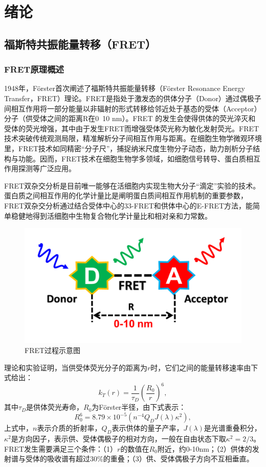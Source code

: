 \chapter{绪论}

\section{福斯特共振能量转移（FRET）}

\subsection{FRET原理概述}

\ifshowtext
1948年，Förster首次阐述了福斯特共振能量转移（Förster Resonance Energy Transfer，FRET）理论。FRET是指处于激发态的供体分子（Donor）通过偶极子间相互作用将一部分能量以非辐射的形式转移给邻近处于基态的受体（Acceptor）分子（供受体之间的距离R在0~10 nm）。FRET 的发生会使得供体的荧光淬灭和受体的荧光增强，其中由于发生FRET而增强受体荧光称为敏化发射荧光。FRET技术突破传统观测局限，精准解析分子间相互作用与距离。在细胞生物学微观环境里，FRET技术如同精密“分子尺”，捕捉纳米尺度生物分子动态，助力剖析分子结构与功能。因而，FRET技术在细胞生物学多领域，如细胞信号转导、蛋白质相互作用探测等广泛应用。

FRET双杂交分析是目前唯一能够在活细胞内实现生物大分子“滴定”实验的技术。蛋白质之间相互作用的化学计量比是阐明蛋白质间相互作用机制的重要参数，FRET双杂交分析通过结合受体中心的33-FRET和供体中心的E-FRET方法，能简单稳健地得到活细胞中生物复合物化学计量比和相对亲和力常数。
\begin{figure}[htbp]
    \centering
    \includegraphics[width=0.5\linewidth]{../figures/1/1_FRET过程示意图.png}
    \caption{FRET过程示意图}
    \label{fig:fret}
\end{figure}

理论和实验证明，当供受体荧光分子的距离为$r$时，它们之间的能量转移速率由下式给出：
\begin{equation}
    k_T(r)=\frac{1}{\tau_D}(\frac{R_0}{r})^6, \label{eq:1-1}
\end{equation}
其中$\tau_D$是供体荧光寿命，$R_0$为Förster半径，由下式表示：
\begin{equation}
    R_0^6=8.79\times{10^{-5}}(n^{-4}Q_DJ(\lambda)\kappa^2),
\end{equation}
上式中，$n$表示介质的折射率，$Q_D$表示供体的量子产率，$J(\lambda)$是光谱重叠积分，$\kappa^2$是方向因子，表示供、受体偶极子的相对方向，一般在自由状态下取$\kappa^2=2/3$。FRET发生需要满足三个条件：（1）$r$的数值在$R_0$附近，约0-10nm；（2）供体的发射谱与受体的吸收谱有超过30\%的重叠；（3）供、受体偶极子方向不互相垂直。

